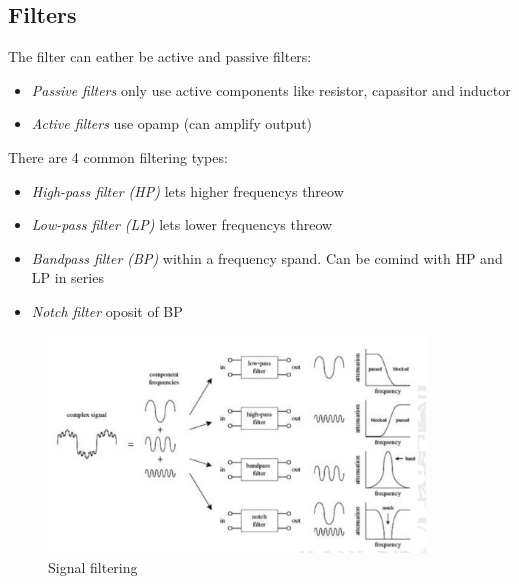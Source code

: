 \documentclass{article}
\begin{document}




\subsection{Filters}
The filter can eather be active and passive filters:
\begin{itemize}
    \item \textit{Passive filters} only use active components like resistor, capasitor and inductor
    \item \textit{Active filters} use opamp (can amplify output)
\end{itemize}

There are 4 common filtering types:
\begin{itemize}
    \item \textit{High-pass filter (HP)} lets higher frequencys threow
    \item \textit{Low-pass filter (LP)} lets lower frequencys threow
    \item \textit{Bandpass filter (BP)} within a frequency spand. Can be comind with HP and LP in series
    \item \textit{Notch filter} oposit of BP
\end{itemize}
\begin{figure}[h]
    \vspace{10mm}
    \centering
    \includegraphics[width=10cm]{image/signal-filtering.png}
    \caption{Signal filtering}
\end{figure}
\end{document}

